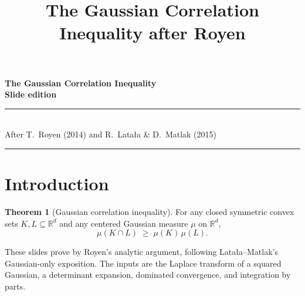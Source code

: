 \documentclass[14pt]{extarticle}
\title{\color{hdrBG}\bfseries\Huge The Gaussian Correlation Inequality after Royen}
\author{}
\date{}
\theoremstyle{definition}
\newtheorem{theorem}{Theorem}[section]
\newcommand{\R}{\mathbb{R}}
\begin{document}
\begin{titlepage}
\thispagestyle{empty}
\vspace*{\fill}
\begin{center}
{\color{hdrBG}\bfseries\fontsize{36}{44}\selectfont The Gaussian Correlation Inequality}\\[0.6em]
{\color{accent}\bfseries\Large Slide edition}\\[2em]
\rule{60mm}{0.8pt}\\[.5em]
{\large After T.\ Royen (2014) and R.\ Lata{\l}a \& D.\ Matlak (2015)}\\[.5em]
\rule{60mm}{0.8pt}
\end{center}
\vspace*{\fill}
\end{titlepage}


\section{Introduction}\label{sec:intro}

\begin{theorem}[Gaussian correlation inequality]\label{thm:gcc_geom}
  For any closed symmetric convex sets $K,L\subseteq\R^d$ and any
  centered Gaussian measure $\mu$ on $\R^d$,
  \begin{equation}\label{eq:gcc}
    \mu(K\cap L)\;\geqslant\;\mu(K)\,\mu(L).
  \end{equation}
\end{theorem}

These slides prove  by Royen's analytic argument,
following Lata{\l}a--Matlak's Gaussian-only exposition.  The inputs
are the Laplace transform of a squared Gaussian, a determinant
expansion, dominated convergence, and integration by parts.
\end{document}

